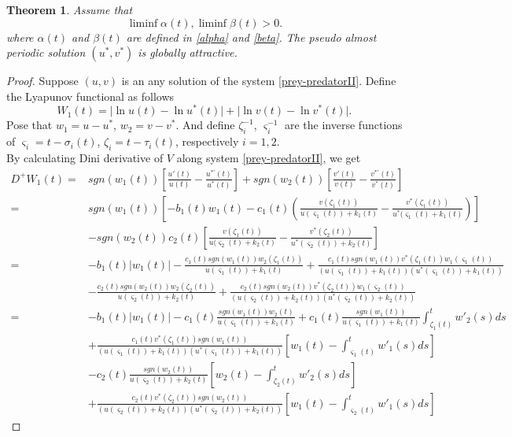 \documentclass[[a4paper,10pt]{article}
\newtheorem{theorem}{Theorem}[section]
\begin{document}
  \begin{theorem}\label{stabilityprey}
  Assume that $$\liminf \alpha(t),\liminf \beta(t)>0.$$
  where $\alpha(t)$ and $ \beta(t)$ are defined in \ref{alpha} and \ref{beta}. 
The pseudo almost periodic solution $(u^*,v^*)$  is globally attractive.
  \end{theorem}

  \begin{proof}\item
  Suppose $(u, v)$ is an any solution of the system \eqref{prey-predatorII}. Define the Lyapunov functional as follows
$$W_1 (t) = \big |\ln u(t)-\ln u^*(t)\big| + \big|\ln v(t)-\ln v^*(t)\big|.$$
Pose that $w_1=u-u^*$, $w_2=v-v^*$. And define $\zeta_i^{-1}$, $\varsigma^{-1}_i$ are the inverse functions of $\varsigma_i=t-\sigma_i(t)$, $\zeta_i=t-\tau_i(t)$, respectively $i=1,2$.\\
By calculating Dini derivative of $V$ along system \eqref{prey-predatorII}, we get
\begin{equation}\label{D+W1}
\begin{aligned}
 D^+ W_1(t)=& sgn(w_1(t))\left[\frac{u'(t)}{u(t)} -\frac{u^{*'} (t)}{u^*(t)} \right]+sgn(w_2(t))\left[\frac{v'(t)}{v(t)} -\frac{v^{*'} (t)}{v^*(t)} \right]\\
=& sgn(w_1(t))\left[-b_1(t)w_1(t)-c_1(t)\left(\frac{v(\zeta_1(t))}{u(\varsigma_1(t))+k_1(t)} -\frac{v^*(\zeta_1(t))}{u^*(\varsigma_1(t)+k_1(t)} \right)\right]\\
&-sgn(w_2(t))c_2(t)\left[\frac{v(\zeta_1(t))}{u(\varsigma_2(t)+k_2(t)} -\frac{v^*(\zeta_2(t))}{u^*(\varsigma_2(t))+k_2(t)} \right]\\
=& -b_1(t)\left|w_1(t)\right|-\frac{c_1(t) sgn(w_1(t))w_2(\zeta_1(t))}{u(\varsigma_1(t))+k_1(t)}+\frac{c_1(t)sgn(w_1(t))v^*(\zeta_1(t))w_1(\varsigma_1(t))}{(u(\varsigma_1(t))+k_1(t))(u^*(\varsigma_1(t))+k_1(t))}\\
&-\frac{c_2(t) sgn(w_2(t))w_2(\zeta_2(t))}{u(\varsigma_2(t))+k_2(t)}+\frac{c_2(t) sgn(w_2(t))v^*(\zeta_2(t))w_1(\varsigma_2(t))}{(u(\varsigma_2(t))+k_2(t))(u^*(\varsigma_2(t))+k_2(t))}\\
=& -b_1(t)\left|w_1(t)\right|-c_1(t) \frac{sgn(w_1(t))w_2(t)}{u(\varsigma_1(t))+k_1(t)} +c_1(t) \frac{sgn(w_1(t))}{u(\varsigma_1(t))+k_1(t)} {\displaystyle\int^t_{\zeta_1(t)}}w'_2(s)ds\\
&+\frac{c_1(t) v^*(\zeta_1(t))sgn(w_1(t))}{(u(\varsigma_1(t))+k_1(t))(u^*(\varsigma_1(t))+k_1(t))}\left[w_1(t)- {\displaystyle \int^t_{\varsigma_1(t)}w'_1(s)}ds\right]\\
&-c_2(t) \frac{sgn(w_2(t))}{u(\varsigma_2(t))+k_2(t)}\left[w_2(t)-\displaystyle\int^t_{\zeta_2(t)}w'_2(s)ds\right]\\
&+\frac{c_2(t) v^*(\zeta_2(t))sgn(w_2(t))}{(u(\varsigma_2(t))+k_2(t))(u^*(\varsigma_2(t))+k_2(t))}\left[w_1(t)- \displaystyle \int^t_{\varsigma_2(t)}w'_1(s)ds\right]\end{aligned}
\end{equation}


\end{proof}
\end{document}
